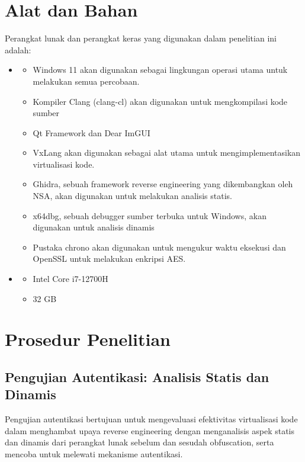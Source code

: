 \section{Alat dan Bahan}
Perangkat lunak dan perangkat keras yang digunakan dalam penelitian ini adalah:

\begin{itemize}
	\item {}
	      \begin{itemize}
		      \item {} Windows 11 akan digunakan sebagai lingkungan operasi utama untuk melakukan semua percobaan.
		      \item {} Kompiler Clang (clang-cl) akan digunakan untuk mengkompilasi kode sumber
		      \item {} Qt Framework dan Dear ImGUI
		      \item {} VxLang akan digunakan sebagai alat utama untuk mengimplementasikan virtualisasi kode.
		      \item {} Ghidra, sebuah framework reverse engineering yang dikembangkan oleh NSA, akan digunakan untuk melakukan analisis statis.
		      \item {} x64dbg, sebuah debugger sumber terbuka untuk Windows, akan digunakan untuk analisis dinamis
		      \item {} Pustaka chrono akan digunakan untuk mengukur waktu eksekusi dan OpenSSL untuk melakukan enkripsi AES.
	      \end{itemize}
	\item {}
	      \begin{itemize}
		      \item {} Intel Core i7-12700H
		      \item {} 32 GB
	      \end{itemize}
\end{itemize}

\section{Prosedur Penelitian}
\subsection{Pengujian Autentikasi: Analisis Statis dan Dinamis}
Pengujian autentikasi bertujuan untuk mengevaluasi efektivitas virtualisasi kode dalam menghambat upaya reverse engineering dengan menganalisis aspek statis dan dinamis dari perangkat lunak sebelum dan sesudah obfuscation, serta mencoba untuk melewati mekanisme autentikasi.

